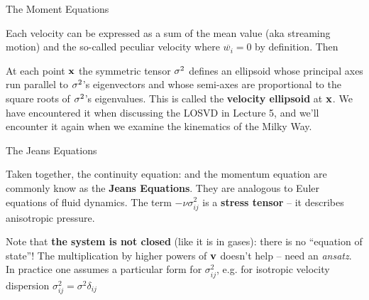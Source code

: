 \documentclass[letterpaper,landscape]{slides}
\begin{document}
\begin{slide}
\begin{center}
{\large \color{red} 
                    The Moment Equations     }
\end{center}


Each velocity can be expressed as a sum of the mean value (aka streaming
motion) and the so-called peculiar velocity
where $\overline{w_i}=0$ by definition. Then

At each point ${\bf x}$ the symmetric tensor ${\bf \sigma}^2$ defines an
ellipsoid whose principal axes run parallel to ${\bf \sigma}^2$'s
eigenvectors and whose semi-axes are proportional to the square roots
of ${\bf \sigma}^2$'s eigenvalues.  This is called the {\bf velocity
ellipsoid} at ${\bf x}$. We have encountered it when discussing the LOSVD in
Lecture 5, and we'll encounter it again when we examine the kinematics
of the Milky Way.

\vfill
\end{slide}



\begin{slide}
\begin{center}
{\large \color{red} 
                    The Jeans Equations   }
\end{center}

Taken together, the continuity equation:
and the momentum equation
are commonly know as the {\bf Jeans Equations}. They are analogous to Euler equations
of fluid dynamics. The term $-\nu \sigma^2_{ij}$ is a {\bf stress tensor} -- it describes 
anisotropic pressure.

Note that {\bf the system is not closed} (like it is in gases): there is no 
``equation of state''! The multiplication by higher powers of ${\bf v}$ doesn't
help -- need an {\it ansatz}. In practice one
assumes a particular form for $\sigma^2_{ij}$, e.g. for isotropic velocity
dispersion $\sigma^2_{ij} = \sigma^2 \delta_{ij}$

\vfill
\end{slide}
\end{document}
